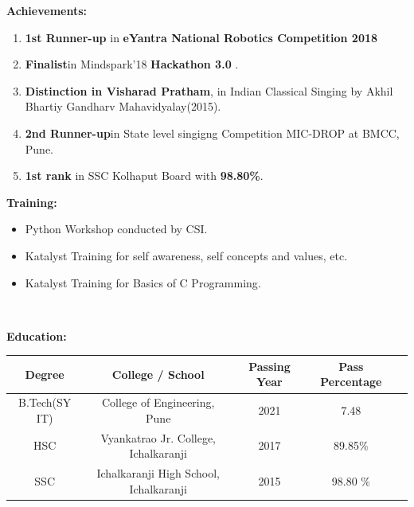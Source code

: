 \documentclass[a4paper,11pt]{article}
\begin{document}
\begin{minipage}[t]{0.5\textwidth}
			\raggedright\smallskip
			\begin{LARGE}
				\textbf{Achievements:}\medskip%
				{\small
					\begin{enumerate}
						\item \textbf{1st Runner-up} in \textbf{eYantra National Robotics Competition 2018}
						\item \textbf{Finalist}in Mindspark'18 \textbf{Hackathon 3.0} .
						\item \textbf{Distinction in Visharad Pratham}, in Indian Classical Singing by Akhil Bhartiy Gandharv Mahavidyalay(2015).
						\item \textbf{2nd Runner-up}in State level singigng Competition MIC-DROP at BMCC, Pune.
						\item \textbf{1st rank} in SSC Kolhaput Board with \textbf{98.80\%}.
					\end{enumerate}
				}
			\end{LARGE}
			\vspace{0.65cm}

\begin{Large}
				\textbf{Training:}\medskip%
				{\small
					\begin{itemize}
						\item {Python Workshop conducted by CSI.}
						\item {Katalyst Training for self awareness, self concepts and values, etc.}
						\item {Katalyst Training for Basics of C Programming}.
					\end{itemize}
				}
			\end{Large}

			\
\end{minipage}%

\begin{Large}
	\textbf{Education:}\medskip%
\end{Large}

 \begin{large}
	\bigbreak
		\begin{tabular}{|c |c |c |c |c |}
			\hline
			Degree & College / School  & Passing Year & Pass Percentage \\
			\hline
			B.Tech(SY IT)& College of Engineering, Pune& 2021 & 7.48\\
			\hline
			HSC &Vyankatrao Jr. College, Ichalkaranji & 2017 & 89.85\% \\
			\hline
			SSC & Ichalkaranji High School, Ichalkaranji & 2015 & 98.80 \%\\
			\hline
	 	\end{tabular}
\end{large}
\vspace{0.5cm}
\end{document}
